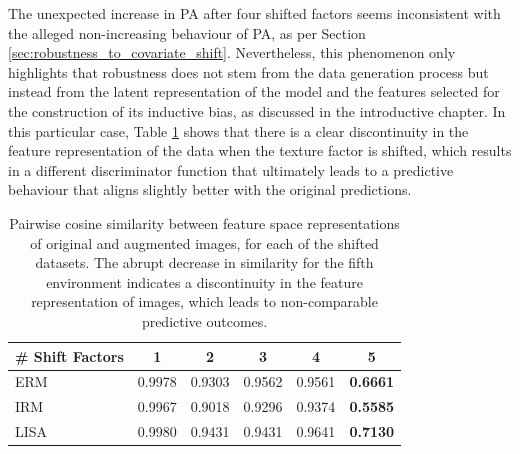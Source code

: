 The unexpected increase in PA after four shifted factors seems
inconsistent with the alleged non-increasing behaviour of PA, as per
Section \ref{sec:robustness_to_covariate_shift}. Nevertheless, this phenomenon 
only highlights that robustness does not stem from the data generation process but instead 
from the latent representation of the model and the features selected for the construction 
of its inductive bias, as discussed in the introductive chapter. In this particular case, 
Table \ref{tab:CS_shift} shows that
there is a clear discontinuity in the feature representation of the data when the texture
factor is shifted, which results in a different discriminator function that ultimately
leads to a predictive behaviour that aligns slightly better with the original predictions. \\

\begin{table}[H]
    \centering
    \begin{tabular}{l|c|c|c|c|c}
    \# Shift Factors & 1 & 2 & 3 & 4 & 5 \\
    \midrule
    ERM & 0.9978 & 0.9303 & 0.9562 & 0.9561 & \textbf{0.6661} \\
    IRM & 0.9967 & 0.9018 & 0.9296 & 0.9374 & \textbf{0.5585} \\
    LISA  & 0.9980 & 0.9431 & 0.9431 & 0.9641 & \textbf{0.7130} \\
    \bottomrule
    \end{tabular}
    \caption{
    Pairwise cosine similarity between feature space representations of original and
    augmented images, for each of the shifted datasets. The abrupt decrease in similarity
    for the fifth environment indicates a discontinuity in the feature representation of images,
    which leads to non-comparable predictive outcomes.
    }
    \label{tab:CS_shift}
    \end{table}




